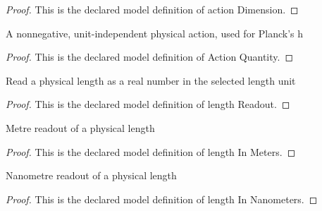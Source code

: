\begin{proof}
  This is the declared model definition of action Dimension.
\end{proof}
\begin{definition}
  \label{def:physics:phyx-mini-0557:phyxminiproblems-problemphyxmini0557-actionquantity}
  A nonnegative, unit-independent physical action, used for Planck's h
\end{definition}
\begin{proof}
  This is the declared model definition of Action Quantity.
\end{proof}
\begin{definition}
  \label{def:physics:phyx-mini-0557:phyxminiproblems-problemphyxmini0557-lengthreadout}
  Read a physical length as a real number in the selected length unit
\end{definition}
\begin{proof}
  This is the declared model definition of length Readout.
\end{proof}
\begin{definition}
  \label{def:physics:phyx-mini-0557:phyxminiproblems-problemphyxmini0557-lengthinmeters}
  Metre readout of a physical length
\end{definition}
\begin{proof}
  This is the declared model definition of length In Meters.
\end{proof}
\begin{definition}
  \label{def:physics:phyx-mini-0557:phyxminiproblems-problemphyxmini0557-lengthinnanometers}
  Nanometre readout of a physical length
\end{definition}
\begin{proof}
  This is the declared model definition of length In Nanometers.
\end{proof}
